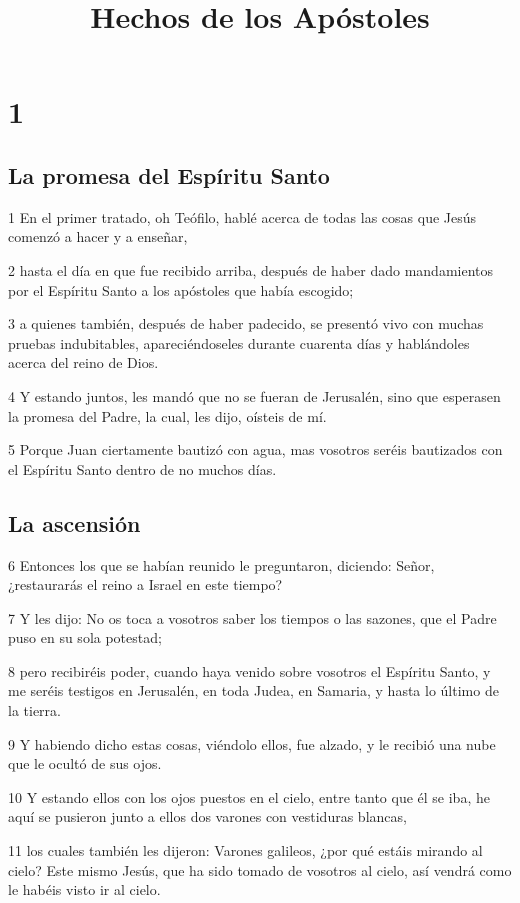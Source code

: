 
\title{Hechos de los Apóstoles}

\chapter{1}

\section*{La promesa del Espíritu Santo}

\par 1 En el primer tratado, oh Teófilo, hablé acerca de todas las cosas que Jesús comenzó a hacer y a enseñar,
\par 2 hasta el día en que fue recibido arriba, después de haber dado mandamientos por el Espíritu Santo a los apóstoles que había escogido;
\par 3 a quienes también, después de haber padecido, se presentó vivo con muchas pruebas indubitables, apareciéndoseles durante cuarenta días y hablándoles acerca del reino de Dios.
\par 4 Y estando juntos, les mandó que no se fueran de Jerusalén, sino que esperasen la promesa del Padre, la cual, les dijo, oísteis de mí.
\par 5 Porque Juan ciertamente bautizó con agua, mas vosotros seréis bautizados con el Espíritu Santo dentro de no muchos días.

\section*{La ascensión}

\par 6 Entonces los que se habían reunido le preguntaron, diciendo: Señor, ¿restaurarás el reino a Israel en este tiempo?
\par 7 Y les dijo: No os toca a vosotros saber los tiempos o las sazones, que el Padre puso en su sola potestad;
\par 8 pero recibiréis poder, cuando haya venido sobre vosotros el Espíritu Santo, y me seréis testigos en Jerusalén, en toda Judea, en Samaria, y hasta lo último de la tierra.
\par 9 Y habiendo dicho estas cosas, viéndolo ellos, fue alzado, y le recibió una nube que le ocultó de sus ojos.
\par 10 Y estando ellos con los ojos puestos en el cielo, entre tanto que él se iba, he aquí se pusieron junto a ellos dos varones con vestiduras blancas,
\par 11 los cuales también les dijeron: Varones galileos, ¿por qué estáis mirando al cielo? Este mismo Jesús, que ha sido tomado de vosotros al cielo, así vendrá como le habéis visto ir al cielo.

